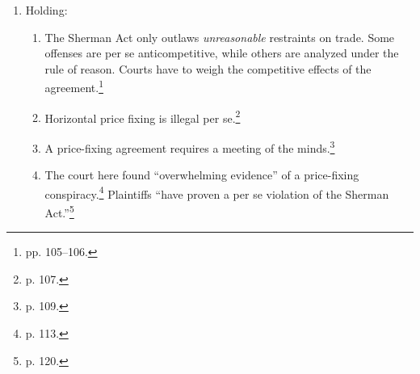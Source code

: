 \begin{enumerate}
\begin{enumerate}
        the market.\footnote{p. 94.} ``The publisher defendants used the change 
        to an agency method for distributing their e-books as an opportunity to 
        raise the prices for their e-books across the board.''\footnote{p. 96.}
        \item The publishers lost sales as a result of the price increases, and 
        consumers suffered because they had to pay more for ebooks, buy cheaper 
        ebooks, or defer purchases entirely.\footnote{p. 98.}
    \end{enumerate}
    \item Holding:
    \begin{enumerate}
        \item The Sherman Act only outlaws \emph{unreasonable} restraints on 
        trade. Some offenses are per se anticompetitive, while others are 
        analyzed under the rule of reason. Courts have to weigh the competitive 
        effects of the agreement.\footnote{pp. 105--106.}
        \item Horizontal price fixing is illegal per se.\footnote{p. 107.}
        \item A price-fixing agreement requires a meeting of the 
        minds.\footnote{p. 109.}
        \item The court here found ``overwhelming evidence'' of a price-fixing 
        conspiracy.\footnote{p. 113.} Plaintiffs ``have proven a per se 
        violation of the Sherman Act.''\footnote{p. 120.}
    \end{enumerate}
\end{enumerate}

